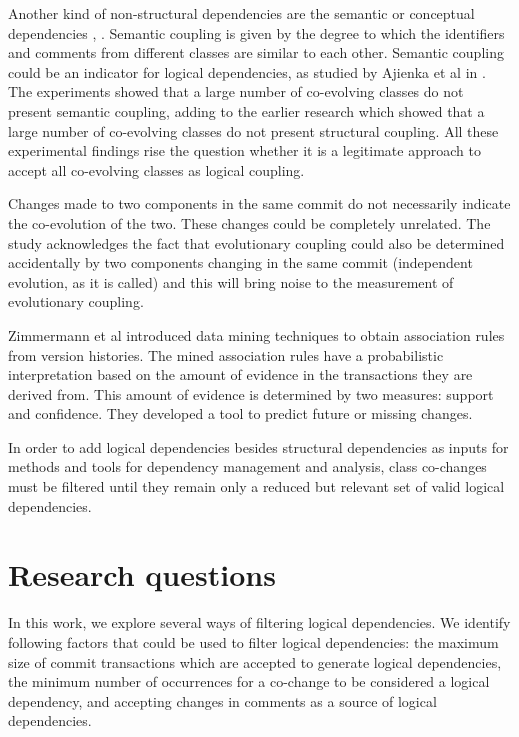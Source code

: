 \documentclass[a4paper,twoside]{article}
\begin{document}
Another kind of non-structural dependencies are the semantic or conceptual dependencies \cite{Poshyvanyk2009}, \cite{posh2010}. Semantic coupling is given by the degree to which the identifiers
and comments from different classes are similar to each other. Semantic coupling could be an indicator for logical dependencies, as studied by Ajienka et al in \cite{DBLP:journals/ese/AjienkaCC18}. The experiments showed that a large number of co-evolving classes do not present semantic coupling, adding to the earlier research which showed that a large number of co-evolving classes do not present structural coupling. All these experimental findings rise the question whether it is a legitimate approach to accept all co-evolving classes as logical coupling.


Changes made to two components in the same commit do not necessarily indicate the co-evolution of the two. These changes could be completely unrelated. The study \cite{Yu2007} acknowledges the fact that evolutionary coupling could also be determined accidentally by two components changing in the same commit (independent evolution, as it is called) and this will bring noise to the measurement of evolutionary coupling. 


Zimmermann et al \cite{Zimmermann:2004:MVH:998675.999460} introduced data mining techniques to obtain association
rules from version histories.
The mined association rules  have a probabilistic interpretation based on the amount of
evidence in the transactions they are derived from. This
amount of evidence is determined by two measures: 
support and confidence.  They developed a tool to predict future or
missing changes.

In order to add logical dependencies besides structural dependencies as inputs for methods and tools for dependency management and analysis, class co-changes must be filtered until they remain only a reduced but relevant set of valid logical dependencies. 

\section{Research questions}
\label{sec:question}

In this work, we explore several ways of filtering logical dependencies.  We identify following factors that could be used to filter logical dependencies: the maximum size of commit transactions which are accepted to generate logical dependencies, the minimum number of occurrences for a co-change to be considered a logical dependency, and accepting changes in comments as a source of logical dependencies. 
\end{document}
